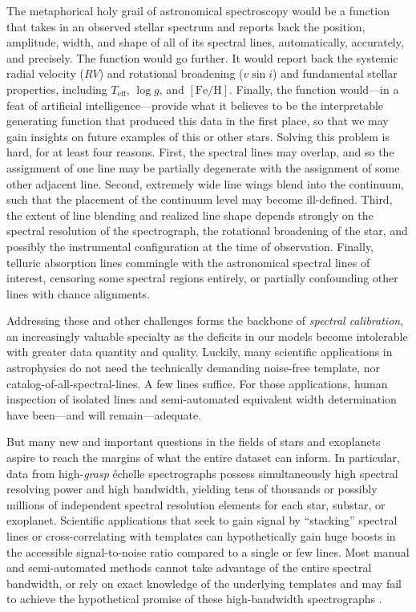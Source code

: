 \documentclass[twocolumn]{aastex631}
\begin{document}
The metaphorical holy grail of astronomical spectroscopy would be a function that takes in an observed stellar spectrum and reports back the position, amplitude, width, and shape of all of its spectral lines, automatically, accurately, and precisely.  The function would go further. It would report back the systemic radial velocity ($RV$) and rotational broadening ($v\sin{i}$) and fundamental stellar properties, including $T_{\mathrm{eff}}$, $\log{g}$, and $[\mathrm{Fe}/\mathrm{H}]$.  Finally, the function would---in a feat of artificial intelligence---provide what it believes to be the interpretable generating function that produced this data in the first place, so that we may gain insights on future examples of this or other stars.  Solving this problem is hard, for at least four reasons.  First, the spectral lines may overlap, and so the assignment of one line may be partially degenerate with the assignment of some other adjacent line.  Second, extremely wide line wings blend into the continuum, such that the placement of the continuum level may become ill-defined.  Third, the extent of line blending and realized line shape depends strongly on the spectral resolution of the spectrograph, the rotational broadening of the star, and possibly the instrumental configuration at the time of observation.  Finally, telluric absorption lines commingle with the astronomical spectral lines of interest, censoring some spectral regions entirely, or partially confounding other lines with chance alignments.

Addressing these and other challenges forms the backbone of \emph{spectral calibration}, an increasingly valuable specialty as the deficits in our models become intolerable with greater data quantity and quality.  Luckily, many scientific applications in astrophysics do not need the technically demanding noise-free template, nor catalog-of-all-spectral-lines.  A few lines suffice.  For those applications, human inspection of isolated lines and semi-automated equivalent width determination have been---and will remain---adequate.

But many new and important questions in the fields of stars and exoplanets aspire to reach the margins of what the entire dataset can inform.  In particular, data from high-\emph{grasp} \'echelle spectrographs possess simultaneously high spectral resolving power and high bandwidth, yielding tens of thousands or possibly millions of independent spectral resolution elements for each star, substar, or exoplanet.  Scientific applications that seek to gain signal by ``stacking'' spectral lines or cross-correlating with templates can hypothetically gain huge boosts in the accessible signal-to-noise ratio compared to a single or few lines.  Most manual and semi-automated methods cannot take advantage of the entire spectral bandwidth, or rely on exact knowledge of the underlying templates and may fail to achieve the hypothetical promise of these high-bandwidth spectrographs \citep{2020AJ....160..198H}.
\end{document}
